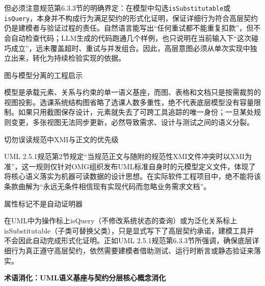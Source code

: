 \documentclass[UTF8,a4paper,11pt,fontset=fandol]{ctexart}
\begin{document}
但必须注意规范第6.3.3节的明确界定：在模型中勾选\texttt{isSubstitutable}或\texttt{isQuery}，本身并不构成行为满足契约的形式化证明，保证详细行为符合高层契约仍是建模者与验证过程的责任。自然语言能写出“任何重试都不能重复扣款”，但不会自动检查代码；LLM生成的代码跑通几个样例，也只说明在当前输入下“这次碰巧成立”，远未覆盖超时、重试与并发组合。因此，高层意图必须从单次实现中独立出来，转化为持续检验实现的依据。

\begin{importantbox}{图与模型分离的工程启示}

模型是承载元素、关系与约束的单一语义基座，而图、表格和文档只是按需裁剪的视图投影。选课系统结构图省略了选课人数多重性，绝不代表底层模型没有容量限制。如果只用截图保存设计，元素就失去了可跨工具追踪的唯一身份；一旦某处规则变更，多张视图无法同步更新，必然导致需求、设计与测试之间的语义分裂。

\end{importantbox}

\begin{warningbox}{切勿误读规范中XMI与正文的优先级}

UML 2.5.1规范第2节规定“当规范正文与随附的规范性XMI文件冲突时以XMI为准”，这一规则仅针对OMG组织发布UML标准自身时的元模型定义文件，体现了将核心语义落实为机器可读数据的设计思想。在实际软件工程项目中，绝不能将该条款曲解为“永远无条件相信现有实现代码而忽略业务需求文档”。

\end{warningbox}

\begin{knowledgebox}{属性标记不是自动证明器}

在UML中为操作标上isQuery（不修改系统状态的查询）或为泛化关系标上isSubstitutable（子类可替换父类），只是显式写下了高层契约承诺，建模工具并不会因此自动完成形式化证明。正如UML 2.5.1规范第6.3.3节所强调，确保底层详细行为真正遵守高层契约，依然需要建模者借助测试、运行时断言或静态验证来落实。

\end{knowledgebox}

\par{}\textbf{术语消化：UML语义基座与契约分层核心概念消化}
\end{document}
